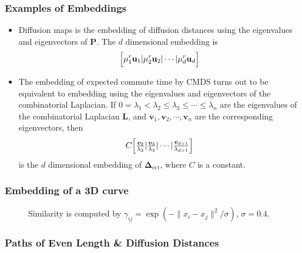 \documentclass[professionalfonts, hyperref={pdfpagelabels=false,
  colorlinks=true, linkcolor=purple}]{beamer}
\begin{document}
\begin{frame}
  \frametitle{Examples of Embeddings}
  \begin{itemize}
    \item Diffusion maps \cite{coifman06:_diffus_maps} is the
      embedding of diffusion distances using the eigenvalues and
      eigenvectors of $\mathbf{P}$. The $d$ dimensional embedding is
      \begin{equation*}
        \Bigl[ \mu_1^{r} \mathbf{u}_1 | \mu_{2}^{r} \mathbf{u}_2 |
        \cdots | \mu_{d}^{r}  \mathbf{u}_d \Bigr]
      \end{equation*}
    \item The embedding of expected commute time by CMDS turns out
      to be equivalent to embedding using the eigenvalues and
      eigenvectors of the combinatorial
      Laplacian. If $0 = \lambda_1 < \lambda_2 \leq \lambda_3 \leq \cdots
      \leq \lambda_{n}$ are the eigenvalues of the combinatorial
      Laplacian $\mathbf{L}$, and $\bm{v}_1, \bm{v}_2, \cdots,
      \bm{v}_n$ are the corresponding eigenvectors, then
      \begin{equation*}
        C \Bigl[ \tfrac{\bm{v}_{2}}{\lambda_2} |
        \tfrac{\bm{v}_3}{\lambda_3}
        | \cdots | \tfrac{\bm{v}_{d+1}}{\lambda_{d+1}} \Bigr]
      \end{equation*}
      is the $d$ dimensional embedding of
      $\bm{\Delta}_{\mathrm{ect}}$, where $C$ is a constant.  
  \end{itemize}
\end{frame}

\begin{frame}
\frametitle{Embedding of a 3D curve}
  \subfiglabelskip=0pt
  \begin{figure}[htbp]
    \label{fig:logistic}
    \centering
    \hspace{3pt}
    \caption{Similarity is computed by $\gamma_{ij} = \exp(-\|x_i -
      x_j\|^{2}/\sigma)$, $\sigma = 0.4$.}
  \end{figure}

\end{frame}

\begin{frame}
\frametitle{Paths of Even Length  \& Diffusion Distances}
  \subfiglabelskip=0pt
  \begin{figure}[htbp]
    \label{fig:two-step}
    \centering
    \hspace{3pt}
  \end{figure}

\end{frame}
\end{document}
